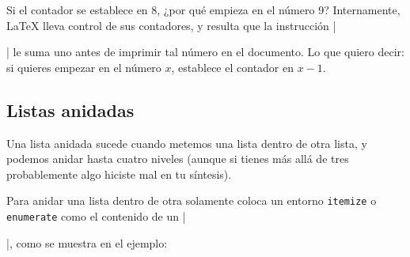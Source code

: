 Si el contador se establece en 8, ¿por qué empieza en el número 9? Internamente, \LaTeX{} lleva control de sus contadores, y resulta que la instrucción |\item| le suma uno antes de imprimir tal número en el documento. Lo que quiero decir: si quieres empezar en el número $x$, establece el contador en $x - 1$.



\subsection{Listas anidadas}
\label{sub:listas_anidadas}



Una lista anidada sucede cuando metemos una lista dentro de otra lista, y podemos anidar hasta cuatro niveles (aunque si tienes más allá de tres probablemente algo hiciste mal en tu síntesis).

Para anidar una lista dentro de otra solamente coloca un entorno \texttt{itemize} o \texttt{enumerate} como el contenido de un |\item|, como se muestra en el ejemplo:

